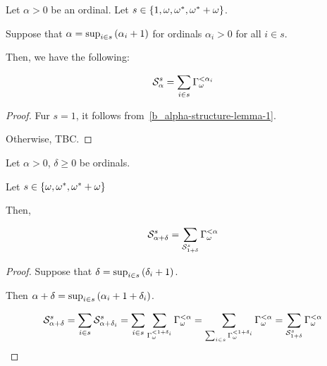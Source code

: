 \begin{lemma}\label{b_alpha-structure-lemma}
  Let $\alpha > 0$ be an ordinal.
  Let $s \in \left\{ {1, \omega, \omega^\ast, \omega^\ast + \omega} \right\}$.

  Suppose that
  $\alpha = \sup_{i \in s} \left( {\alpha_i + 1} \right)$ for
  ordinals $\alpha_i > 0$ for all $i \in s$.

  Then, we have the following:

  \[
    \mathcal{S}^{s}_{\alpha} = \sum_{i \in s}{\Gamma_{\omega}^{< \alpha_i}}
  \]
\end{lemma}

\begin{proof}
  Fur $s = 1$, it follows from~\cref{b_alpha-structure-lemma-1}.

  Otherwise, TBC.
\end{proof}

\begin{corollary}
  Let $\alpha > 0$, $\delta \ge 0$ be ordinals.

  Let $s \in \left\{ {\omega, \omega^\ast, \omega^\ast + \omega} \right\}$

  Then,

  \[
    \mathcal{S}^{s}_{\alpha + \delta}
    = \sum_{\mathcal{S}^{s}_{1 + \delta}}{\Gamma_{\omega}^{< \alpha}}
  \]
\end{corollary}

\begin{proof}
  Suppose that $\delta = \sup_{i \in s} \left( {\delta_i + 1} \right)$.

  Then $\alpha + \delta = \sup_{i \in s} \left( {\alpha_i + 1 + \delta_i} \right)$.

  \[
    \mathcal{S}^{s}_{\alpha + \delta}
    = \sum_{i \in s}{\mathcal{S}^{s}_{\alpha + \delta_i}}
    = \sum_{i \in s}\sum_{\Gamma_{\omega}^{< 1 + \delta_i}}{\Gamma_{\omega}^{< \alpha}}
    = \sum_{\sum_{i \in s}{\Gamma_{\omega}^{< 1 + \delta_i}}}{\Gamma_{\omega}^{< \alpha}}
    = \sum_{\mathcal{S}^{s}_{1 + \delta}}{\Gamma_{\omega}^{< \alpha}}
  \]
\end{proof}
